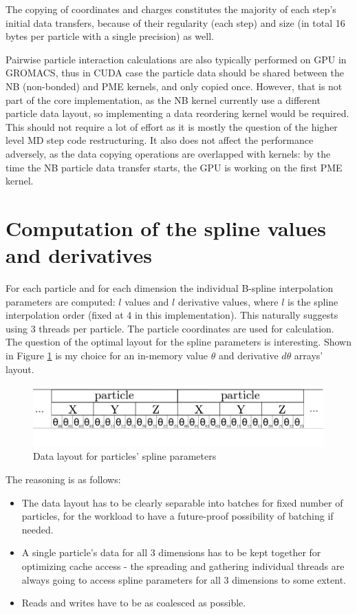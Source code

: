 \documentclass[12pt,a4paper,notitlepage]{report}
\newcommand{\draft}[1]{#1}
\begin{document}
The copying of coordinates and charges constitutes the majority of each step's initial data transfers, because of their regularity (each step) and size (in total 16 bytes per particle with a single precision) as well.

Pairwise particle interaction calculations are also typically performed on GPU in GROMACS, thus in CUDA case the particle data should be shared between the NB (non-bonded) and PME kernels, and only copied once. However, that is not part of the core implementation, as the NB kernel currently use a different particle data layout, so implementing a data reordering kernel would be required. This should not require a lot of effort as it is mostly the question of the higher level MD step code restructuring. It also does not affect the performance adversely, as the data copying operations are overlapped with kernels: by the time the NB particle data transfer starts, the GPU is working on the first PME kernel.

\section{Computation of the spline values \\ and derivatives}
For each particle and for each dimension the individual B-spline interpolation parameters are computed: $l$ values and $l$ derivative values, where $l$ is the spline interpolation order (fixed at 4 in this implementation). This naturally suggests using 3 threads per particle. The particle coordinates are used for calculation.
The question of the optimal layout for the spline parameters is interesting. Shown in Figure \ref{fig:spline} is my choice for an in-memory value $\theta$ and derivative $d\theta$ arrays' layout. 
\FloatBarrier
\begin{figure}[h!]
    \centering
    \includegraphics[width=1\textwidth]{pics/theta.png}
    \caption{Data layout for particles' spline parameters}
    \label{fig:spline}
\end{figure}
\FloatBarrier
The reasoning is as follows:
\begin{itemize}
\item The data layout has to be clearly separable into batches for fixed number of particles, for the workload to have a future-proof possibility of batching if needed.
\item A single particle's data for all 3 dimensions has to be kept together for optimizing cache access - the spreading and gathering individual threads are always going to access spline parameters for all 3 dimensions to some extent. 
\item Reads and writes have to be as coalesced as possible.
\end{itemize}
\end{document}
